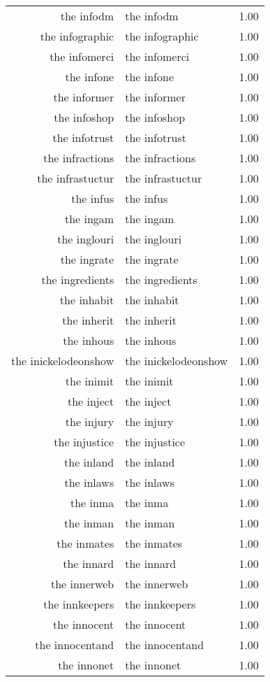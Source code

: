 \begin{table}[ht]
\begin{tabular}{rlr}
  the infodm & the infodm & 1.00 \\ 
  the infographic & the infographic & 1.00 \\ 
  the infomerci & the infomerci & 1.00 \\ 
  the infone & the infone & 1.00 \\ 
  the informer & the informer & 1.00 \\ 
  the infoshop & the infoshop & 1.00 \\ 
  the infotrust & the infotrust & 1.00 \\ 
  the infractions & the infractions & 1.00 \\ 
  the infrastuctur & the infrastuctur & 1.00 \\ 
  the infus & the infus & 1.00 \\ 
  the ingam & the ingam & 1.00 \\ 
  the inglouri & the inglouri & 1.00 \\ 
  the ingrate & the ingrate & 1.00 \\ 
  the ingredients & the ingredients & 1.00 \\ 
  the inhabit & the inhabit & 1.00 \\ 
  the inherit & the inherit & 1.00 \\ 
  the inhous & the inhous & 1.00 \\ 
  the inickelodeonshow & the inickelodeonshow & 1.00 \\ 
  the inimit & the inimit & 1.00 \\ 
  the inject & the inject & 1.00 \\ 
  the injury & the injury & 1.00 \\ 
  the injustice & the injustice & 1.00 \\ 
  the inland & the inland & 1.00 \\ 
  the inlaws & the inlaws & 1.00 \\ 
  the inma & the inma & 1.00 \\ 
  the inman & the inman & 1.00 \\ 
  the inmates & the inmates & 1.00 \\ 
  the innard & the innard & 1.00 \\ 
  the innerweb & the innerweb & 1.00 \\ 
  the innkeepers & the innkeepers & 1.00 \\ 
  the innocent & the innocent & 1.00 \\ 
  the innocentand & the innocentand & 1.00 \\ 
  the innonet & the innonet & 1.00 \\ 

\end{tabular}
\end{table}
